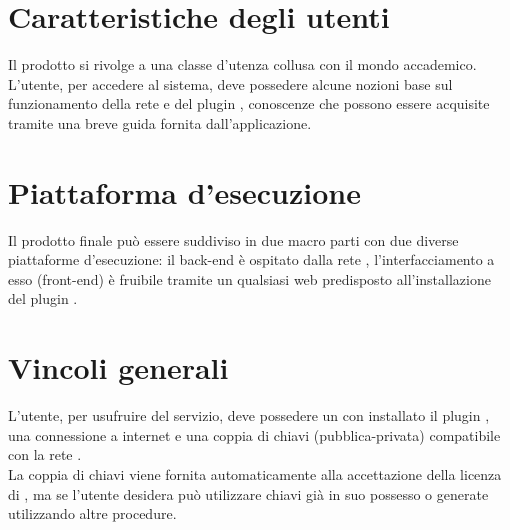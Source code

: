 \documentclass[AnalisiDeiRequisiti.tex]{subfiles}
\begin{document}
\section{Caratteristiche degli utenti}
Il prodotto si rivolge a una classe d'utenza collusa con il mondo accademico.\\
L'utente, per accedere al sistema, deve possedere alcune nozioni base sul funzionamento della rete  e del plugin , conoscenze che possono essere acquisite tramite una breve guida fornita dall'applicazione.

\section{Piattaforma d'esecuzione}
Il prodotto finale può essere suddiviso in due macro parti con due diverse piattaforme d'esecuzione: il back-end è ospitato dalla rete , l'interfacciamento a esso (front-end) è fruibile tramite un qualsiasi  web predisposto all'installazione del plugin .

\section{Vincoli generali}
L'utente, per usufruire del servizio, deve possedere un  con installato il plugin , una connessione a internet e una coppia di chiavi (pubblica-privata) compatibile con la rete .\\
La coppia di chiavi viene fornita automaticamente alla accettazione della licenza di , ma se l'utente desidera può utilizzare chiavi già in suo possesso o generate utilizzando altre procedure.	
\end{document}
